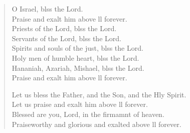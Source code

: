 \begin{verse}
\begin{patverse}
O Israel, blss the Lord.\Med\\
Praise and exalt him above ll forever.\\
Priests of the Lord, blss the Lord.\Med\\
Servants of the Lord, blss the Lord.\\
Spirits and souls of the just, blss the Lord.\Med\\
Holy men of humble heart, blss the Lord.\\
Hananiah, Azariah, Mishael, blss the Lord.\Med\\
Praise and exalt him above ll forever.

Let us bless the Father, and the Son, and the Hly Spirit.\Med\\
Let us praise and exalt him above ll forever.\\
Blessed are you, Lord, in the firmamnt of heaven.\Med\\
Praiseworthy and glorious and exalted above ll forever.
  \end{patverse}
\end{verse}
